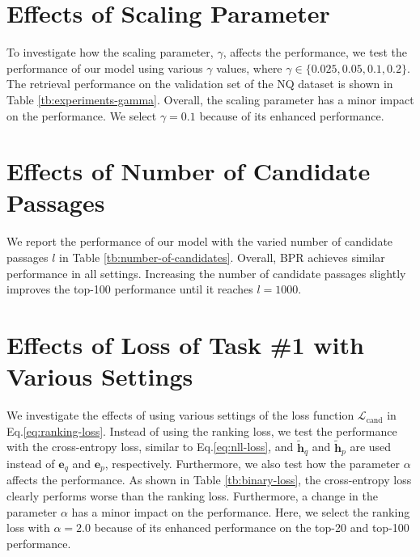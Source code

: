\documentclass[11pt,a4paper]{article}
\begin{document}
\section{Effects of Scaling Parameter}
\label{sec:effects-gamma}

To investigate how the scaling parameter, $\gamma$, affects the performance, we test the performance of our model using various $\gamma$ values, where $\gamma \in \{0.025, 0.05, 0.1, 0.2\}$.
The retrieval performance on the validation set of the NQ dataset is shown in Table \ref{tb:experiments-gamma}.
Overall, the scaling parameter has a minor impact on the performance.
We select $\gamma = 0.1$ because of its enhanced performance.

\section{Effects of Number of Candidate Passages}
\label{sec:effects-num-candidates}

We report the performance of our model with the varied number of candidate passages $l$ in Table \ref{tb:number-of-candidates}.
Overall, BPR achieves similar performance in all settings.
Increasing the number of candidate passages slightly improves the top-100 performance until it reaches $l=1000$.

\section{Effects of Loss of Task \#1 with Various Settings}
\label{sec:effects-binary-loss}

We investigate the effects of using various settings of the loss function $\mathcal{L}_\text{cand}$ in Eq.\eqref{eq:ranking-loss}.
Instead of using the ranking loss, we test the performance with the cross-entropy loss, similar to Eq.\eqref{eq:nll-loss}, and $\mathbf{\tilde{h}}_q$ and $\mathbf{\tilde{h}}_p$ are used instead of $\mathbf{e}_q$ and $\mathbf{e}_p$, respectively.
Furthermore, we also test how the parameter $\alpha$ affects the performance.
As shown in Table \ref{tb:binary-loss}, the cross-entropy loss clearly performs worse than the ranking loss.
Furthermore, a change in the parameter $\alpha$ has a minor impact on the performance.
Here, we select the ranking loss with $\alpha=2.0$ because of its enhanced performance on the top-20 and top-100 performance.
\end{document}
